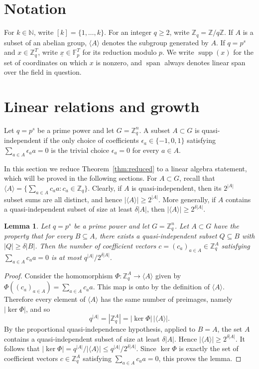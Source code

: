 \documentclass[11pt]{amsart}
\newtheorem{lemma}[theorem]{Lemma}
\newcommand{\N}{\mathbb{N}}
\newcommand{\Z}{\mathbb{Z}}
\newcommand{\F}{\mathbb{F}}
\DeclareMathOperator{\Span}{span}
\begin{document}
\section{Notation}
For \(k\in\N\), write \([k]=\{1,\ldots,k\}\). For an integer \(q\geq 2\), write \(\Z_q=\Z/q\Z\). If \(A\) is a subset of an abelian group, \(\langle A\rangle\) denotes the subgroup generated by \(A\). If \(q=p^s\) and \(x\in\Z_q^T\), write \(\underline{x}\in\F_p^T\) for its reduction modulo \(p\). We write \(\operatorname{supp}(x)\) for the set of coordinates on which \(x\) is nonzero, and \(\Span\) always denotes linear span over the field in question. 


\section{Linear relations and growth}
Let \(q=p^s\) be a prime power and let \(G=\Z_q^n\). A subset \(A\subset G\) is quasi-independent if the only choice of coefficients \(\epsilon_a\in\{-1,0,1\}\) satisfying \(\sum_{a\in A}\epsilon_a a=0\) is the trivial choice \(\epsilon_a=0\) for every \(a\in A\).

In this section we reduce Theorem~\ref{thm:reduced} to a linear algebra statement, which will be proved in the following sections. For \(A\subset G\), recall that \(\langle A\rangle=\{\sum_{a\in A}c_a a:c_a\in\Z_q\}\). Clearly, if \(A\) is quasi-independent, then its \(2^{|A|}\) subset sums are all distinct, and hence \(|\langle A\rangle|\geq 2^{|A|}\). More generally, if \(A\) contains a quasi-independent subset of size at least \(\delta |A|\), then \(|\langle A\rangle|\geq 2^{\delta |A|}\).

\begin{lemma}\label{lem:kernel-size}
Let \(q=p^s\) be a prime power and let \(G=\Z_q^n\). Let \(A\subset G\) have the property that for every \(B\subseteq A\), there exists a quasi-independent subset \(Q\subseteq B\) with \(|Q|\geq \delta |B|\). Then the number of coefficient vectors \(c=(c_a)_{a\in A}\in\Z_q^A\) satisfying \(\sum_{a\in A}c_a a=0\) is at most \(q^{|A|}/2^{\delta |A|}\).
\end{lemma}

\begin{proof}
Consider the homomorphism \(\Phi:\Z_q^A\to \langle A\rangle\) given by \(\Phi((c_a)_{a\in A})=\sum_{a\in A}c_a a\). This map is onto by the definition of \(\langle A\rangle\). Therefore every element of \(\langle A\rangle\) has the same number of preimages, namely \(|\ker\Phi|\), and so
$$
        q^{|A|}=|\Z_q^A|=|\ker\Phi|\,|\langle A\rangle|.
$$
By the proportional quasi-independence hypothesis, applied to \(B=A\), the set \(A\) contains a quasi-independent subset of size at least \(\delta |A|\). Hence \(|\langle A\rangle|\geq 2^{\delta |A|}\). It follows that \(|\ker\Phi|=q^{|A|}/|\langle A\rangle|\leq q^{|A|}/2^{\delta |A|}\). Since \(\ker\Phi\) is exactly the set of coefficient vectors \(c\in\Z_q^A\) satisfying \(\sum_{a\in A}c_a a=0\), this proves the lemma.
\end{proof}
\end{document}
